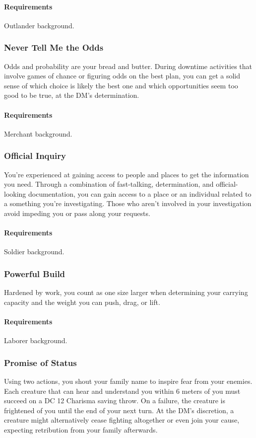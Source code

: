     \paragraph{Requirements} Outlander background.
\subsubsection{Never Tell Me the Odds} \label{feat::nevertellmetheodds}
    Odds and probability are your bread and butter.
    During downtime activities that involve games of chance or figuring odds on the best plan, you can get a solid sense of which choice is likely the best one and which opportunities seem too good to be true, at the DM's determination.
    \paragraph{Requirements} Merchant background.
\subsubsection{Official Inquiry} \label{feat::officialinquiry}
    You're experienced at gaining access to people and places to get the information you need.
    Through a combination of fast-talking, determination, and official-looking documentation, you can gain access to a place or an individual related to a something you're investigating.
    Those who aren't involved in your investigation avoid impeding you or pass along your requests.
    \paragraph{Requirements} Soldier background.
\subsubsection{Powerful Build} \label{feat::powerfulbuild_bg}
    Hardened by work, you count as one size larger when determining your carrying capacity and the weight you can push, drag, or lift.
    \paragraph{Requirements} Laborer background.
\subsubsection{Promise of Status} \label{feat::promiseofstatus}
    Using two actions, you shout your family name to inspire fear from your enemies.
    Each creature that can hear and understand you within 6 meters of you must succeed on a DC 12 Charisma saving throw.
    On a failure, the creature is frightened of you until the end of your next turn.
    At the DM's discretion, a creature might alternatively cease fighting altogether or even join your cause, expecting retribution from your family afterwards.

